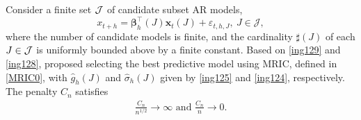 \documentclass[ejsv2]{imsart}
\theoremstyle{plain}
\theoremstyle{definition}
\theoremstyle{remark}
\begin{document}
Consider a finite set ${\cal J}$ of candidate subset AR models,
\begin{equation*}
x_{t+h}=\bm{\beta}_h^\top(J)\mathbf{x}_{t}(J)+\varepsilon_{t,h,J},\ J\in\mathcal{J},
\end{equation*}
where the number of candidate models is finite,
and the cardinality $\sharp{(J)}$
of each $J \in {\cal J}$ is uniformly bounded above by a finite constant.
Based on
\eqref{ing129} and \eqref{ing128},
\cite{Hsu2019} proposed selecting the best predictive model
using MRIC, defined in \eqref{MRIC0}, with
$\hat{g}_{h}(J)$
and $\hat{\sigma}_{h}(J)$
given by
\eqref{ing125}
and \eqref{ing124}, respectively.
The penalty
$C_n$ satisfies
\begin{eqnarray}
\label{ing126}
\frac{C_n}{n^{1/2}}\to\infty \,\,\mbox{and}\,\, \frac{C_n}{n} \to 0.
\end{eqnarray}
\end{document}
